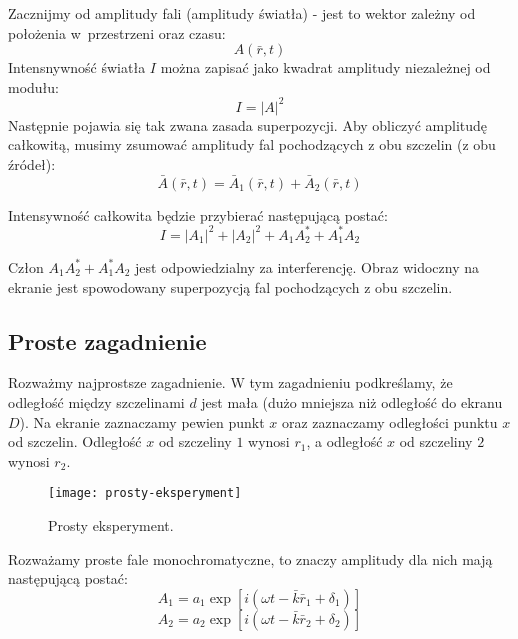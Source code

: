 Zacznijmy od amplitudy fali (amplitudy światła) - jest to wektor zależny od położenia w~przestrzeni oraz czasu:
\begin{equation*}
    A(\bar{r}, t)
\end{equation*}
Intensnywność światła $I$ można zapisać jako kwadrat amplitudy niezależnej od modułu:
\begin{equation*}
    I = |A|^2
\end{equation*}
Następnie pojawia się tak zwana zasada superpozycji. Aby obliczyć amplitudę całkowitą, musimy zsumować amplitudy fal pochodzących z obu szczelin (z obu źródeł):
\begin{equation*}
    \bar{A}(\bar{r}, t) = \bar{A}_1(\bar{r}, t) + \bar{A}_2(\bar{r}, t)
\end{equation*}

Intensywność całkowita będzie przybierać następującą postać:
\begin{equation*}
    I = |A_1|^2 + |A_2|^2 + A_1 A_2^* + A_1^* A_2
\end{equation*}

Człon $A_1 A_2^* + A_1^* A_2$ jest odpowiedzialny za interferencję. Obraz widoczny na ekranie jest spowodowany superpozycją fal pochodzących z obu szczelin.

\subsection{Proste zagadnienie}

Rozważmy najprostsze zagadnienie. W tym zagadnieniu podkreślamy, że odległość między szczelinami $d$ jest mała (dużo mniejsza niż odległość do ekranu $D$).
Na ekranie zaznaczamy pewien punkt $x$ oraz zaznaczamy odległości punktu $x$ od szczelin. Odległość $x$ od szczeliny $1$ wynosi $r_1$, a odległość $x$
od szczeliny $2$ wynosi $r_2$.

\begin{figure}[H]
    \centering
    \texttt{[image: prosty-eksperyment]}
    \caption{Prosty eksperyment.}
    \label{fig:prosty-eksperyment}
\end{figure}

Rozważamy proste fale monochromatyczne, to znaczy amplitudy dla nich mają następującą postać:
\begin{equation*}
    A_1 = a_1 \exp[i(\omega t - \bar{k} \bar{r}_1 + \delta_1)]
\end{equation*}
\begin{equation*}
    A_2 = a_2 \exp[i(\omega t - \bar{k} \bar{r}_2 + \delta_2)]
\end{equation*}

